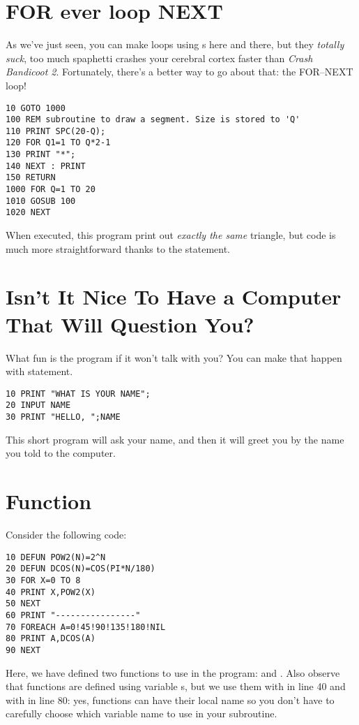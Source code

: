 \section[FOR--NEXT Loop]{FOR ever loop NEXT}

As we've just seen, you can make loops using s here and there, but they \emph{totally suck}, too much spaphetti crashes your cerebral cortex faster than \emph{Crash Bandicoot 2}. Fortunately, there's a better way to go about that: the FOR--NEXT loop!

\begin{lstlisting}
10 GOTO 1000
100 REM subroutine to draw a segment. Size is stored to 'Q'
110 PRINT SPC(20-Q);
120 FOR Q1=1 TO Q*2-1
130 PRINT "*";
140 NEXT : PRINT
150 RETURN
1000 FOR Q=1 TO 20
1010 GOSUB 100
1020 NEXT
\end{lstlisting}

When executed, this program print out \emph{exactly the same} triangle, but code is much more straightforward thanks to the  statement.

\section[Get User INPUT]{Isn't It Nice To Have a Computer That Will Question You?}

What fun is the program if it won't talk with you? You can make that happen with  statement.

\begin{lstlisting}
10 PRINT "WHAT IS YOUR NAME";
20 INPUT NAME
30 PRINT "HELLO, ";NAME
\end{lstlisting}

This short program will ask your name, and then it will greet you by the name you told to the computer.

\section[Function]{Function}

Consider the following code:

\begin{lstlisting}
10 DEFUN POW2(N)=2^N
20 DEFUN DCOS(N)=COS(PI*N/180)
30 FOR X=0 TO 8
40 PRINT X,POW2(X)
50 NEXT
60 PRINT "----------------"
70 FOREACH A=0!45!90!135!180!NIL
80 PRINT A,DCOS(A)
90 NEXT
\end{lstlisting}

Here, we have defined two functions to use in the program:  and . Also observe that functions are defined using variable s, but we use them with  in line 40 and with  in line 80: yes, functions can have their local name so you don't have to carefully choose which variable name to use in your subroutine.


